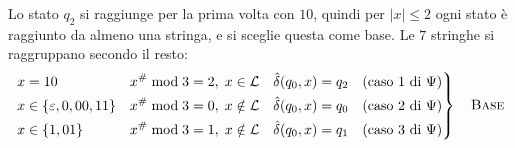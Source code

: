 \documentclass[a4paper, 11pt, oneside]{book}
\theoremstyle{formale}
\begin{document}
    Lo stato $q_2$ si raggiunge per la prima volta con $10$, quindi per $|x| \leq 2$ ogni
    stato \`e raggiunto da almeno una stringa, e si sceglie questa come base. Le $7$
    stringhe si raggruppano secondo il resto:
    \begin{equation*}
        \left.
        \begin{alignedat}{3}
            & x = 10 & \quad & x^\# \bmod 3 = 2,\; x \in \mathcal{L}
                & \quad & \hat{\delta}(q_0, x) = q_2 \quad \text{(caso 1 di $\Psi$)} \\
            & x \in \{\varepsilon, 0, 00, 11\} & & x^\# \bmod 3 = 0,\;
                x \notin \mathcal{L} & & \hat{\delta}(q_0, x) = q_0
                \quad \text{(caso 2 di $\Psi$)} \\
            & x \in \{1, 01\} & & x^\# \bmod 3 = 1,\; x \notin \mathcal{L}
                & & \hat{\delta}(q_0, x) = q_1 \quad \text{(caso 3 di $\Psi$)}
        \end{alignedat}
        \right\}
        \quad \text{\textsc{Base}}
    \end{equation*}
\end{document}
